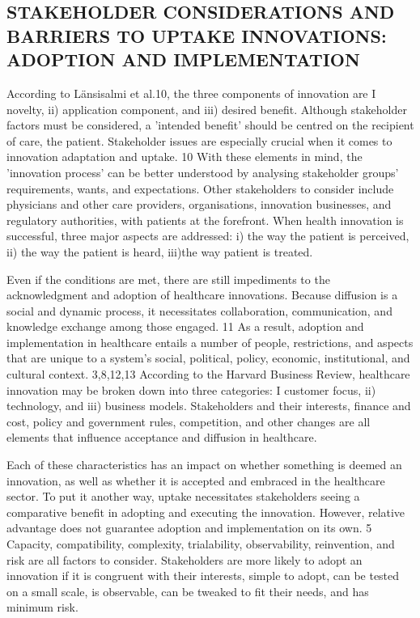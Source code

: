\documentclass[12pt]{article}
\begin{document}
\subsection{STAKEHOLDER CONSIDERATIONS AND BARRIERS TO UPTAKE INNOVATIONS: ADOPTION AND IMPLEMENTATION}

According to Länsisalmi et al.10, the three components of innovation are I novelty, ii) application component, and iii) desired benefit. Although stakeholder factors must be considered, a 'intended benefit' should be centred on the recipient of care, the patient. Stakeholder issues are especially crucial when it comes to innovation adaptation and uptake. 10 With these elements in mind, the 'innovation process' can be better understood by analysing stakeholder groups' requirements, wants, and expectations. Other stakeholders to consider include physicians and other care providers, organisations, innovation businesses, and regulatory authorities, with patients at the forefront. When health innovation is successful, three major aspects are addressed: i) the way the patient is perceived, ii) the way the patient is heard, iii)the way patient is treated.


Even if the conditions are met, there are still impediments to the acknowledgment and adoption of healthcare innovations. Because diffusion is a social and dynamic process, it necessitates collaboration, communication, and knowledge exchange among those engaged. 11 As a result, adoption and implementation in healthcare entails a number of people, restrictions, and aspects that are unique to a system's social, political, policy, economic, institutional, and cultural context. 3,8,12,13 According to the Harvard Business Review, healthcare innovation may be broken down into three categories: I customer focus, ii) technology, and iii) business models. Stakeholders and their interests, finance and cost, policy and government rules, competition, and other changes are all elements that influence acceptance and diffusion in healthcare.

Each of these characteristics has an impact on whether something is deemed an innovation, as well as whether it is accepted and embraced in the healthcare sector. To put it another way, uptake necessitates stakeholders seeing a comparative benefit in adopting and executing the innovation. However, relative advantage does not guarantee adoption and implementation on its own. 5 Capacity, compatibility, complexity, trialability, observability, reinvention, and risk are all factors to consider. Stakeholders are more likely to adopt an innovation if it is congruent with their interests, simple to adopt, can be tested on a small scale, is observable, can be tweaked to fit their needs, and has minimum risk.
\end{document}
